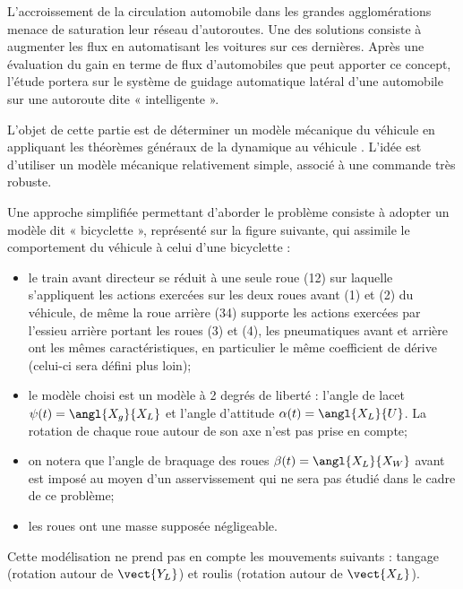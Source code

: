\def\columnseprulecolor{\color{ocre}}
\setlength{\columnseprule}{0.4pt} 


\setcounter{exo}{0}


\ifprof
\else
\begin{multicols}{2}
\fi



L'accroissement de la circulation automobile dans les grandes agglomérations
menace de saturation leur réseau d'autoroutes. Une des solutions consiste à
augmenter les flux en automatisant les voitures sur ces dernières. Après une
évaluation du gain en terme de flux d'automobiles que peut apporter ce concept,
l'étude portera sur le système de guidage automatique latéral d'une automobile
sur une autoroute dite « intelligente ».



\begin{obj}
L'objet de cette partie est de déterminer un modèle mécanique du véhicule en
appliquant les théorèmes généraux de la dynamique au véhicule . L'idée est
d'utiliser un modèle mécanique relativement simple, associé à une commande
très robuste.
\end{obj}

\begin{center}
\end{center}


Une approche simplifiée permettant d'aborder le problème consiste à adopter un
modèle dit « bicyclette », représenté sur la figure suivante, qui assimile le comportement
du véhicule à celui d'une bicyclette :
\begin{itemize}
\item le train avant directeur se réduit à une seule roue (12) sur laquelle s’appliquent
les actions exercées sur les deux roues avant (1) et (2) du véhicule, de
même la roue arrière (34) supporte les actions exercées par l’essieu arrière
portant les roues (3) et (4), les pneumatiques avant et arrière
ont les mêmes caractéristiques, en particulier le même coefficient de dérive
(celui-ci sera défini plus loin);
\item le modèle choisi est un modèle à 2 degrés de liberté : l’angle de lacet
$\psi(t)=\angl{X_g}{X_L}$ et l’angle d’attitude $\alpha(t)=\angl{X_L}{U}$. La rotation de chaque
roue autour de son axe n’est pas prise en compte;
\item on notera que l’angle de braquage des roues $\beta(t)=\angl{X_L}{X_W}$ avant est
imposé au moyen d’un asservissement qui ne sera pas étudié dans le cadre
de ce problème;
\item les roues ont une masse supposée négligeable.
\end{itemize}
Cette modélisation ne prend pas en compte les mouvements suivants : tangage
(rotation autour de $\vect{Y_L}$) et roulis (rotation autour de $\vect{X_L}$).




\end{multicols}
